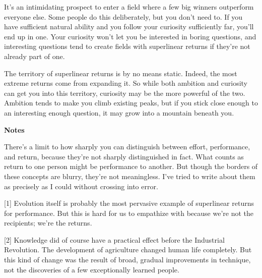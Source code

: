                   It's an intimidating prospect to enter a field where a few big
                  winners outperform everyone else. Some people do this
                  deliberately, but you don't need to. If you have sufficient
                  natural ability and you follow your curiosity sufficiently
                  far, you'll end up in one. Your curiosity won't let you be
                  interested in boring questions, and interesting questions tend
                  to create fields with superlinear returns if they're not
                  already part of one.

The territory of superlinear
                  returns is by no means static. Indeed, the most extreme
                  returns come from expanding it. So while both ambition and
                  curiosity can get you into this territory, curiosity may be
                  the more powerful of the two. Ambition tends to make you climb
                  existing peaks, but if you stick close enough to an
                  interesting enough question, it may grow into a mountain
                  beneath you.









\textbf{Notes}

There's a limit to how sharply you can
                  distinguish between effort, performance, and return, because
                  they're not sharply distinguished in fact. What counts as
                  return to one person might be performance to another. But
                  though the borders of these concepts are blurry, they're not
                  meaningless. I've tried to write about them as precisely as I
                  could without crossing into error.

[1] Evolution itself is probably the most pervasive example of
                  superlinear returns for performance. But this is hard for us
                  to empathize with because we're not the recipients; we're the
                  returns.

[2] Knowledge did of course have a practical effect before the
                  Industrial Revolution. The development of agriculture changed
                  human life completely. But this kind of change was the result
                  of broad, gradual improvements in technique, not the
                  discoveries of a few exceptionally learned people.

